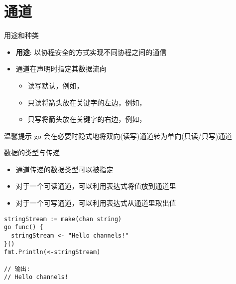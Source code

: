 \section{通道\channel }
\begin{frame}{用途和种类}
    \begin{itemize}
        \item \textbf{用途}: 以协程安全的方式实现不同协程之间的通信 
        \item 通道在声明时指定其数据流向
            \begin{itemize}
                \item \alert{读写}\quad 默认，例如，
                \item \alert{只读}\quad 将\code{<-}箭头放在关键字的左边，例如，
                \item \alert{只写}\quad 将\code{<-}箭头放在关键字的右边，例如，
            \end{itemize}
    \end{itemize}

    \pause
    \begin{exampleblock}{温馨提示}
        go 会在必要时隐式地将双向(读写)通道转为单向(只读/只写)通道 
    \end{exampleblock}
\end{frame}

\begin{frame}[fragile]{数据的类型与传递}
    \begin{itemize}
        \item 通道传递的数据类型可以被指定
        \item 对于一个可读通道，可以利用表达式将值放到通道里
        \item 对于一个可写通道，可以利用表达式从通道里取出值
    \end{itemize}
\begin{lstlisting}[caption={通道数据传递样例}]
stringStream := make(chan string)
go func() {
  stringStream <- "Hello channels!"
}()
fmt.Println(<-stringStream)

// 输出:
// Hello channels!    
\end{lstlisting}    
\end{frame}

